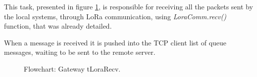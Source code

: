 
This task, presented in figure \ref{fig:gwtLoraRecv}, is responsible for receiving all the packets sent by the local systems, through LoRa communication, using \textit{LoraComm.recv()} function, that was already detailed.

When a message is received it is pushed into the TCP client list of queue messages, waiting to be sent to the remote server.

\begin{figure}[H]
	\centering
	\caption{Flowchart: Gateway tLoraRecv.}
	\label{fig:gwtLoraRecv}
\end{figure}

%
%


